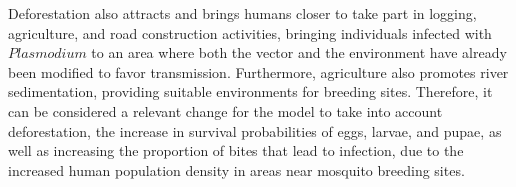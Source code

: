 \documentclass[a4paper,fleqn]{cas-dc}
\begin{document}
Deforestation also attracts and brings humans closer 
to take part in logging, agriculture, and road construction 
activities, bringing individuals infected with $Plasmodium$ to 
an area where both the vector and the environment have already 
been modified to favor transmission. Furthermore, agriculture 
also promotes river sedimentation, providing suitable environments 
for breeding sites. Therefore, it can be considered a relevant 
change for the model to take into account deforestation, the 
increase in survival probabilities of eggs, larvae, and pupae, 
as well as increasing the proportion of bites that lead to infection, 
due to the increased human population density in areas near mosquito 
breeding sites.





 \begin{thebibliography}{00}



\end{thebibliography}
\end{document}
